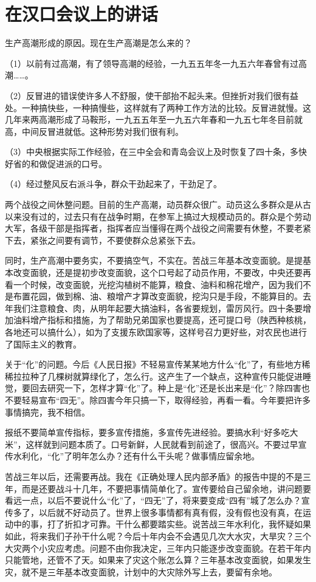 \section[在汉口会议上的讲话（一九五八年四月六日）]{在汉口会议上的讲话}


生产高潮形成的原因。现在生产高潮是怎么来的？

（1）以前有过高潮，有了领导高潮的经验，一九五五年冬一九五六年春曾有过高潮……。

（2）反冒进的错误使许多人不舒服，使干部抬不起头来。但挫折对我们很有益处。一种搞快些，一种搞慢些，这样就有了两种工作方法的比较。反冒进就慢。这几年来两高潮形成了马鞍形，一九五五年至一九五六年春和一九五七年冬目前就高，中间反冒进就低。这种形势对我们很有利。

（3）中央根据实际工作经验，在三中全会和青岛会议上及时恢复了四十条，多快好省的和做促进派的口号。

（4）经过整风反右派斗争，群众干劲起来了，干劲足了。

两个战役之间休整问题。目前的生产高潮，动员群众很广。动员这么多群众是从古以来没有过的，过去只有在战争时期，在参军上搞过大规模动员的。群众是个劳动大军，各级干部是指挥者，指挥者应当懂得在两个战役之间需要有休整，不要老紧下去，紧张之间要有调节，不要使群众总紧张下去。

同时，生产高潮中要务实，不要搞空气，不实在。苦战三年基本改变面貌。是提基本改变面貌，还是提初步改变面貌，这个口号起了动员作用，不要改，中央还要再看一个时候，改变面貌，光挖沟植树不能算，粮食、油料和棉花增产，因为我们不是布置花园，做到棉、油、粮增产才算改变面貌，挖沟只是手段，不能算目的。去年我们注意粮食、肉，从明年起要大搞油料，各省要规划，雷厉风行。四十条要增加油料增产指标和措施，为了帮助兄弟国家也要提高，还可提口号（陕西种核桃，各地还可以搞什么），如为了支援东欧国家等，这样号召力更好些，对农民也进行了国际主义的教育。

关于“化”的问题。今后《人民日报》不轻易宣传某某地方什么“化”了，有些地方稀稀拉拉种了几棵树就算绿化了，怎么行。这产生了一个缺点，这种宣传只能促进睡觉，要回去研究一下，怎样才算“化”了。种上是“化”还是长出来是“化”？除四害也不要轻易宣布“四无”。除四害今年只搞一下，取得经验，再看一看。今年要把许多事情搞完，我不相信。

报纸不要简单宣传指标，要多宣传措施，多宣传先进经验。要搞水利“好多吃大米”，这样就到问题本质了。口号新鲜，人民就看到前途了，很高兴。不要过早宣传水利化，“化”了明年怎么办？还有什么干头呢？做事情应留余地。

苦战三年以后，还需要再战。我在《正确处理人民内部矛盾》的报告中提的不是三年，而是还要战斗十几年，不要把事情简单化了。宣传要给自己留余地，讲问题要看远一点，以后不要说什么“化”了，“四无”了，将来要变成“四有”城了怎么办？宣传多了，以后就不好动员了。世界上很多事情都有真有假，没有假也没有真，在运动中的事，打了折扣才可靠。干什么都要踏实些。说苦战三年水利化，我怀疑如果如此，将来我们子孙干什么呢？今后十年内会不会遇见几次大水灾，大旱灾？三个大灾两个小灾应考虑。问题不由你我决定，三年内只能逐步改变面貌。在若干年内只能管地，还管不了天。如果来了灾这个账怎么算？三年基本改变面貌，如果发生灾，就不是三年基本改变面貌，计划中的大灾除外写上去，要留有余地。

